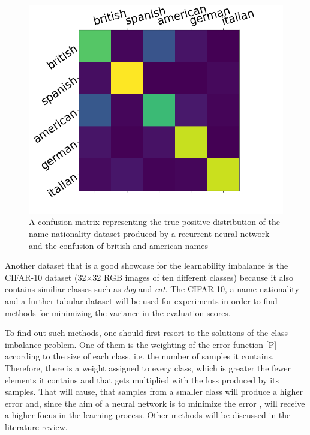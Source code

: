 \documentclass[journal]{IEEEtran}
\begin{document}
\begin{figure}[h!]
        \includegraphics[width=\linewidth]{images/Figure_1.png}
        \caption{A confusion matrix representing the true positive distribution of the name-nationality dataset produced by a recurrent neural network and the confusion of british and american names}
        \label{fig:tp_scores}
\end{figure}

Another dataset that is a good showcase for the learnability imbalance is the CIFAR-10 \cite{krizhevsky2009learning} dataset (32$\times$32 RGB images of ten different classes) because it also contains similiar classes such as \emph{dog} and \emph{cat}.
The CIFAR-10, a name-nationality and a further tabular dataset will be used for experiments in order to find methods for minimizing the variance in the evaluation scores.

To find out such methods, one should first resort to the solutions of the class imbalance problem.
One of them is the weighting of the error function [P] according to the size of each class, i.e. the number of samples it contains.
Therefore, there is a weight assigned to every class, which is greater the fewer elements it contains and that gets multiplied with the loss produced by its samples. %
That will cause, that samples from a smaller class will produce a higher error and, since the aim of a neural network is to minimize the error \cite{rumelhart1985learning}, will receive a higher focus in the learning process.
Other methods will be discussed in the literature review.
\end{document}
